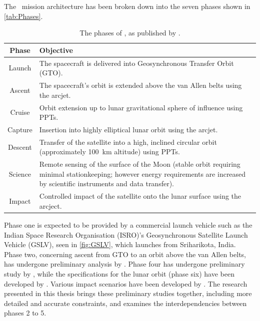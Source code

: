 The \BW\ mission architecture has been broken down into the seven phases shown in \autoref{tab:Phases}.
\begin{table}
\caption{The phases of \BW, as published by \textcite{web_BW-1}.} \label{tab:Phases}
\begin{tabular}{c p{}} \toprule
Phase & Objective \tabularnewline\midrule
Launch & The spacecraft is delivered into Geosynchronous Transfer Orbit (GTO). \tabularnewline
Ascent & The spacecraft's orbit is extended above the van Allen belts using the arcjet. \tabularnewline
Cruise & Orbit extension up to lunar gravitational sphere of influence using PPTs. \tabularnewline
Capture & Insertion into highly elliptical lunar orbit using the arcjet. \tabularnewline
Descent & Transfer of the satellite into a high, inclined circular orbit (approximately 100~km altitude) using PPTs. \tabularnewline
Science & Remote sensing of the surface of the Moon (stable orbit requiring minimal stationkeeping; however energy requirements are increased by scientific instruments and data transfer). \tabularnewline
Impact & Controlled impact of the satellite onto the lunar surface using the arcject. \tabularnewline\bottomrule
\end{tabular}
\end{table}
Phase one is expected to be provided by a commercial launch vehicle such as the Indian Space Research Organisation (ISRO)'s Geosynchronous Satellite Launch Vehicle (GSLV), seen in \autoref{fig:GSLV}, which launches from Sriharikota, India. Phase two, concerning ascent from GTO to an orbit above the van Allen belts, has undergone preliminary analysis by \textcite{Letterio_thesis}. Phase four has undergone preliminary study by \textcite{Moellman2005}, while the specifications for the lunar orbit (phase six) have been developed by \textcite{Zeile2010}. Various impact scenarios have been developed by \textcite{Trawny2004}. The research presented in this thesis brings these preliminary studies together, including more detailed and accurate constraints, and examines the interdependencies between phases 2 to 5.

